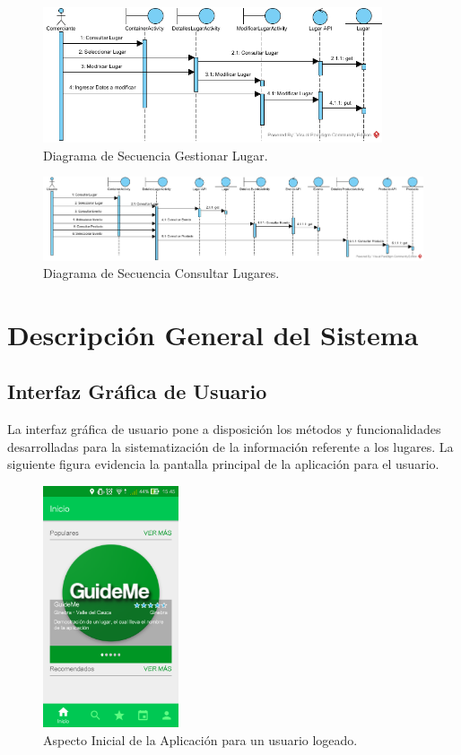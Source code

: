 \documentclass[12pt,letterpaper,openany]{book}
\begin{document}
\begin{figure}[H]
\begin{center}
\includegraphics[width=10cm]{./imagenes/DS/DS_gestionar_lugar}
\caption{Diagrama de Secuencia Gestionar Lugar.}
\end{center}
\end{figure}

\begin{figure}[H]
\begin{center}
\includegraphics[width=14cm]{./imagenes/DS/DS_consultar_lugares}
\caption{Diagrama de Secuencia Consultar Lugares.}
\end{center}
\end{figure}




\section{Descripción General del Sistema}
\subsection{Interfaz Gráfica de Usuario}
La interfaz gráfica de usuario pone a disposición los métodos y funcionalidades desarrolladas para la sistematización de la información referente a los lugares. La siguiente figura evidencia la pantalla principal de la aplicación para el usuario.

\begin{figure}[H]
\begin{center}
\includegraphics[width=4cm]{./imagenes/gui}
\caption{Aspecto Inicial de la Aplicación para un usuario logeado.}
\end{center}
\end{figure}
\end{document}
